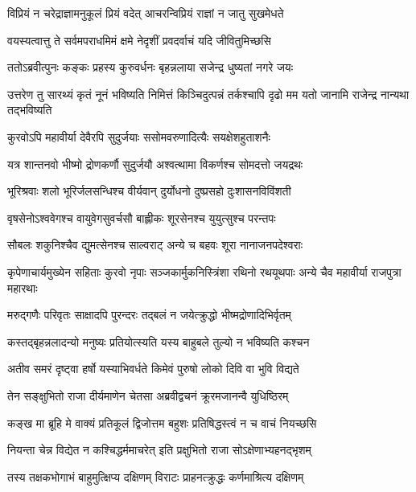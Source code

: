 \twolineshloka
{विप्रियं न चरेद्राज्ञामनुकूलं प्रियं वदेत्}
{आचरन्विप्रियं राज्ञां न जातु सुखमेधते}


\twolineshloka
{वयस्यत्वात्तु ते सर्वमपराधमिमं क्षमे}
{नेदृशीं प्रवदर्वाचं यदि जीवितुमिच्छसि}



\twolineshloka
{ततोऽब्रवीत्पुनः कङ्कः प्रहस्य कुरुवर्धनः}
{बृहन्नलाया सजेन्द्र धुष्यतां नगरे जयः}


\threelineshloka
{उत्तरेण तु सारथ्यं कृतं नूनं भविष्यति}
{निमित्तं किञ्चिदुत्पन्नं तर्कश्चापि दृढो मम}
{यतो जानामि राजेन्द्र नान्यथा तद्भविष्यति}


\twolineshloka
{कुरवोऽपि महावीर्या देवैरपि सुदुर्जयाः}
{ससोमवरुणादित्यैः सयक्षेशहुताशनैः}


\twolineshloka
{यत्र शान्तनवो भीष्मो द्रोणकर्णौ सुदुर्जयौ}
{अश्वत्थामा विकर्णश्च सोमदत्तो जयद्रथः}


\twolineshloka
{भूरिश्रवाः शलो भूरिर्जलसन्धिश्च वीर्यवान्}
{दुर्योधनो दुष्प्रसहो दुःशासनविविंशती}


\twolineshloka
{वृषसेनोऽश्ववेगश्च वायुवेगसुवर्चसौ}
{बाह्लीकः शूरसेनश्च युयुत्सुश्च परन्तपः}


\twolineshloka
{सौबलः शकुनिश्चैव द्युमत्सेनश्च साल्वराट्}
{अन्ये च बहवः शूरा नानाजनपदेश्वराः}


\threelineshloka
{कृपेणाचार्यमुख्येन सहिताः कुरवो नृपाः}
{सञ्जकार्मुकनिस्त्रिंशा रथिनो रथयूथपाः}
{अन्ये चैव महावीर्या राजपुत्रा महारथाः}


\twolineshloka
{मरुद्गणैः परिवृतः साक्षादपि पुरन्दरः}
{तद्बलं न जयेत्क्रुद्धो भीष्मद्रोणादिभिर्वृतम्}


\twolineshloka
{कस्तद्बृहन्नलादन्यो मनुष्यः प्रतियोत्स्यति}
{यस्य बाहुबले तुल्यो न भविष्यति कश्चन}


\twolineshloka
{अतीव समरं दृष्ट्वा हर्षो यस्याभिवर्धते}
{किमेवं पुरुषो लोको दिवि वा भुवि विद्यते}



\twolineshloka
{तेन सङ्क्षुभितो राजा दीर्यमाणेन चेतसा}
{अब्रवीद्वचनं क्रूरमजानन्वै युधिष्ठिरम्}


\twolineshloka
{कङ्ख मा ब्रूहि मे वाक्यं प्रतिकूलं द्विजोत्तम}
{बहुशः प्रतिषिद्धस्त्वं न च वाचं नियच्छसि}


\twolineshloka
{नियन्ता चेन्न विद्येत न कश्चिद्धर्ममाचरेत्}
{इति प्रक्षुभितो राजा सोऽक्षेणाभ्यहनद्भृशम्}


\twolineshloka
{तस्य तक्षकभोगाभं बाहुमुत्क्षिप्य दक्षिणम्}
{विराटः प्राहनत्क्रुद्धः कर्णमाश्रित्य दक्षिणम्}


